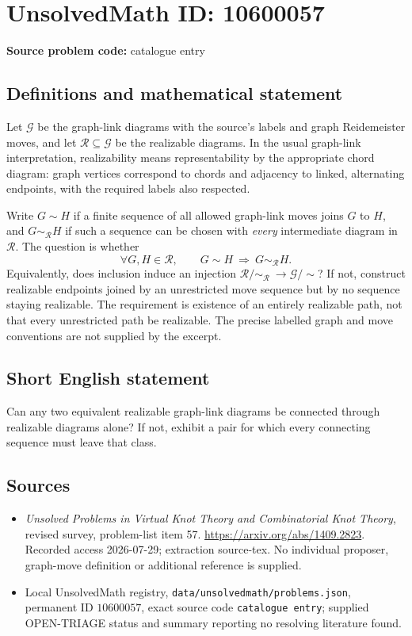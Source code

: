 \documentclass[11pt]{article}
\begin{document}
\section*{UnsolvedMath ID: 10600057}
\textbf{Source problem code:} catalogue entry
\subsection{Definitions and mathematical statement}
Let \(\mathcal G\) be the graph-link diagrams with the source's labels and graph Reidemeister moves, and let \(\mathcal R\subseteq\mathcal G\) be the realizable diagrams. In the usual graph-link interpretation, realizability means representability by the appropriate chord diagram: graph vertices correspond to chords and adjacency to linked, alternating endpoints, with the required labels also respected.

Write \(G\sim H\) if a finite sequence of all allowed graph-link moves joins \(G\) to \(H\), and \(G\sim_{\mathcal R}H\) if such a sequence can be chosen with \emph{every} intermediate diagram in \(\mathcal R\). The question is whether
\[
 \forall G,H\in\mathcal R,\qquad
 G\sim H\ \Longrightarrow\ G\sim_{\mathcal R}H.
\]
Equivalently, does inclusion induce an injection
\(\mathcal R/\!\sim_{\mathcal R}\ \to\mathcal G/\!\sim\)? If not, construct realizable endpoints joined by an unrestricted move sequence but by no sequence staying realizable. The requirement is existence of an entirely realizable path, not that every unrestricted path be realizable. The precise labelled graph and move conventions are not supplied by the excerpt.
\subsection{Short English statement}
Can any two equivalent realizable graph-link diagrams be connected through realizable diagrams alone? If not, exhibit a pair for which every connecting sequence must leave that class.
\subsection{Sources}
\begin{itemize}
\item \emph{Unsolved Problems in Virtual Knot Theory and Combinatorial Knot Theory}, revised survey, problem-list item 57. \url{https://arxiv.org/abs/1409.2823}. Recorded access 2026-07-29; extraction source-tex. No individual proposer, graph-move definition or additional reference is supplied.
\item Local UnsolvedMath registry, \texttt{data/unsolvedmath/problems.json}, permanent ID \(10600057\), exact source code \texttt{catalogue entry}; supplied OPEN-TRIAGE status and summary reporting no resolving literature found.
\end{itemize}
\end{document}
